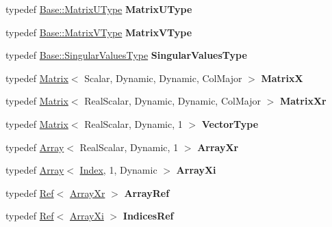 \begin{DoxyCompactItemize}
typedef \mbox{\hyperlink{class_eigen_1_1_matrix}{Base\+::\+Matrix\+U\+Type}} {\bfseries Matrix\+U\+Type}
\item 
\mbox{\label{class_eigen_1_1_b_d_c_s_v_d_a1a1140cddb7727637b5e33d9f3b13299}} 
typedef \mbox{\hyperlink{class_eigen_1_1_matrix}{Base\+::\+Matrix\+V\+Type}} {\bfseries Matrix\+V\+Type}
\item 
\mbox{\label{class_eigen_1_1_b_d_c_s_v_d_a44cd685aa8d3807c006f6557bd69abf8}} 
typedef \mbox{\hyperlink{struct_eigen_1_1internal_1_1true__type}{Base\+::\+Singular\+Values\+Type}} {\bfseries Singular\+Values\+Type}
\item 
\mbox{\label{class_eigen_1_1_b_d_c_s_v_d_acf9211e5353d60fc3209d62fa0e2bdf7}} 
typedef \mbox{\hyperlink{class_eigen_1_1_matrix}{Matrix}}$<$ Scalar, Dynamic, Dynamic, Col\+Major $>$ {\bfseries MatrixX}
\item 
\mbox{\label{class_eigen_1_1_b_d_c_s_v_d_a7b32c2adca9f10283820f437f08f6271}} 
typedef \mbox{\hyperlink{class_eigen_1_1_matrix}{Matrix}}$<$ Real\+Scalar, Dynamic, Dynamic, Col\+Major $>$ {\bfseries Matrix\+Xr}
\item 
\mbox{\label{class_eigen_1_1_b_d_c_s_v_d_a0ea2c57bf088d5fc480ad81945157079}} 
typedef \mbox{\hyperlink{class_eigen_1_1_matrix}{Matrix}}$<$ Real\+Scalar, Dynamic, 1 $>$ {\bfseries Vector\+Type}
\item 
\mbox{\label{class_eigen_1_1_b_d_c_s_v_d_a1e177918a1acf8153ff5f323fbeed9fe}} 
typedef \mbox{\hyperlink{class_eigen_1_1_array}{Array}}$<$ Real\+Scalar, Dynamic, 1 $>$ {\bfseries Array\+Xr}
\item 
\mbox{\label{class_eigen_1_1_b_d_c_s_v_d_a9dea0e28217993ad7de85351357724a7}} 
typedef \mbox{\hyperlink{class_eigen_1_1_array}{Array}}$<$ \mbox{\hyperlink{class_eigen_1_1_s_v_d_base_a6229a37997eca1072b52cca5ee7a2bec}{Index}}, 1, Dynamic $>$ {\bfseries Array\+Xi}
\item 
\mbox{\label{class_eigen_1_1_b_d_c_s_v_d_ad30a7a883b86028c45559593c7a678a2}} 
typedef \mbox{\hyperlink{class_eigen_1_1_ref}{Ref}}$<$ \mbox{\hyperlink{class_eigen_1_1_array}{Array\+Xr}} $>$ {\bfseries Array\+Ref}
\item 
\mbox{\label{class_eigen_1_1_b_d_c_s_v_d_aab1c377c616062cc85356e47312cb412}} 
typedef \mbox{\hyperlink{class_eigen_1_1_ref}{Ref}}$<$ \mbox{\hyperlink{class_eigen_1_1_array}{Array\+Xi}} $>$ {\bfseries Indices\+Ref}
\end{DoxyCompactItemize}
